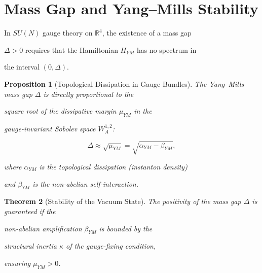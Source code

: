 \documentclass[11pt,a4paper]{amsart}
\newtheorem{theorem}{Theorem}[section]
\newtheorem{proposition}[theorem]{Proposition}
\newcommand{\alphacoeff}{\ensuremath{\alpha}}
\newcommand{\betacoeff}{\ensuremath{\beta}}
\newcommand{\kappacoeff}{\ensuremath{\kappa}}
\newcommand{\mumargin}{\ensuremath{\mu}}
\begin{document}


\section{Mass Gap and Yang--Mills Stability}

In $SU(N)$ gauge theory on $\mathbb{R}^4$, the existence of a mass gap 

$\Delta > 0$ requires that the Hamiltonian $H_{YM}$ has no spectrum in 

the interval $(0, \Delta)$.



\begin{proposition}[Topological Dissipation in Gauge Bundles]

The Yang--Mills mass gap $\Delta$ is directly proportional to the 

square root of the dissipative margin $\mumargin_{YM}$ in the 

gauge-invariant Sobolev space $W^{1,2}_A$:

\begin{equation}

    \Delta \approx \sqrt{\mumargin_{YM}} = \sqrt{\alphacoeff_{YM} - \betacoeff_{YM}},

\end{equation}

where $\alphacoeff_{YM}$ is the topological dissipation (instanton density) 

and $\betacoeff_{YM}$ is the non-abelian self-interaction.

\end{proposition}



\begin{theorem}[Stability of the Vacuum State]

The positivity of the mass gap $\Delta$ is guaranteed if the 

non-abelian amplification $\betacoeff_{YM}$ is bounded by the 

structural inertia $\kappacoeff$ of the gauge-fixing condition, 

ensuring $\mumargin_{YM} > 0$.

\end{theorem}



\end{document}
